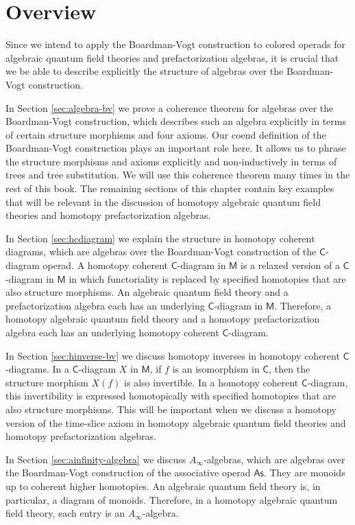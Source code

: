 \documentclass{amsbook}
\numberwithin{section}{chapter}
\numberwithin{subsection}{section}
\numberwithin{equation}{section}
\theoremstyle{plain}
\theoremstyle{definition}
\newcommand{\C}{\mathsf{C}}
\newcommand{\M}{\mathsf{M}}
\newcommand{\As}{\mathsf{As}}
\begin{document}
\section{Overview}
Since we intend to apply the Boardman-Vogt construction to colored operads for algebraic quantum field theories and prefactorization algebras, it is crucial that we be able to describe explicitly the structure of algebras over the Boardman-Vogt construction.

In Section \ref{sec:algebra-bv} we prove a coherence theorem for algebras over the Boardman-Vogt construction, which describes such an algebra explicitly in terms of certain structure morphisms and four axioms.  Our coend definition of the Boardman-Vogt construction plays an important role here.  It allows us to phrase the structure morphisms and axioms explicitly and non-inductively in terms of trees and tree substitution.  We will use this coherence theorem many times in the rest of this book.  The remaining sections of this chapter contain key examples that will be relevant in the discussion of homotopy algebraic quantum field theories and homotopy prefactorization algebras.  

In Section \ref{sec:hcdiagram} we explain the structure in homotopy coherent diagrams, which are algebras over the Boardman-Vogt construction of the $\C$-diagram operad.  A homotopy coherent $\C$-diagram in $\M$ is a relaxed version of a $\C$-diagram in $\M$ in which functoriality is replaced by specified homotopies that are also structure morphisms.  An algebraic quantum field theory and a prefactorization algebra each has an underlying $\C$-diagram in $\M$.  Therefore, a homotopy algebraic quantum field theory and a homotopy prefactorization algebra each has an underlying homotopy coherent $\C$-diagram.  

In Section \ref{sec:hinverse-bv} we discuss homotopy inverses in homotopy coherent $\C$-diagrams.  In a $\C$-diagram $X$ in $\M$, if $f$ is an isomorphism in $\C$, then the structure morphism $X(f)$ is also invertible.  In a homotopy coherent $\C$-diagram, this invertibility is expressed homotopically with specified homotopies that are also structure morphisms.  This will be important when we discuss a homotopy version of the time-slice axiom in homotopy algebraic quantum field theories and homotopy prefactorization algebras.

In Section \ref{sec:ainfinity-algebra} we discuss $A_{\infty}$-algebras, which are algebras over the Boardman-Vogt construction of the associative operad $\As$.  They are monoids up to coherent higher homotopies.  An algebraic quantum field theory is, in particular, a diagram of monoids.  Therefore, in a homotopy algebraic quantum field theory, each entry is an $A_\infty$-algebra.
\end{document}
